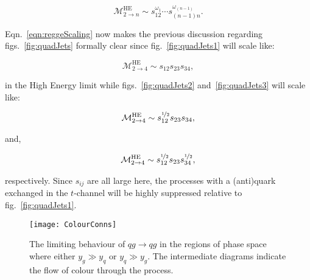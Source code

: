 	\begin{equation}
		\mathcal{M}^{\text{HE}}_{2\to n}\sim s_{12}^{\omega_1}\cdots s_{(n-1)n}^{\omega_{(n-1)}}.
		\label{eqn:reggeScaling}
	\end{equation}

	Eqn.~\eqref{eqn:reggeScaling} now makes the previous discussion regarding figs.~\eqref{fig:quadJets}
	formally clear since fig.~\eqref{fig:quadJets1} will scale like:

	\begin{equation}
		\mathcal{M}^{\text{HE}}_{2\to 4} \sim s_{12}s_{23}s_{34},
	\end{equation}

	in the High Energy limit while figs.~\eqref{fig:quadJets2} and~\eqref{fig:quadJets3} will scale
	like:

	\begin{align}
	\begin{split}
		\mathcal{M}^{\text{HE}}_{2\to 4} \sim s_{12}^{\nicefrac{1}{2}}s_{23}s_{34},\\
	\end{split}
	\end{align}

	and,

	\begin{align}
	\begin{split}
		\mathcal{M}^{\text{HE}}_{2\to 4} \sim s_{12}^{\nicefrac{1}{2}}s_{23}s_{34}^{\nicefrac{1}{2}},
	\end{split}
	\end{align}

	respectively.  Since $s_{ij}$ are all large here, the processes with a (anti)quark exchanged
	in the $t$-channel will be highly suppressed relative to fig.~\eqref{fig:quadJets1}.

	\begin{figure}[bth]
		\begin{center}
		\texttt{[image: ColourConns]}
		\caption{The limiting behaviour of $qg\to qg$ in the regions of phase space where
		either $y_g\gg y_q$ or $y_q\gg y_g$.  The intermediate diagrams indicate the flow
		of colour through the process.}
		\label{fig:colorConns}
		\end{center}
	\end{figure}

